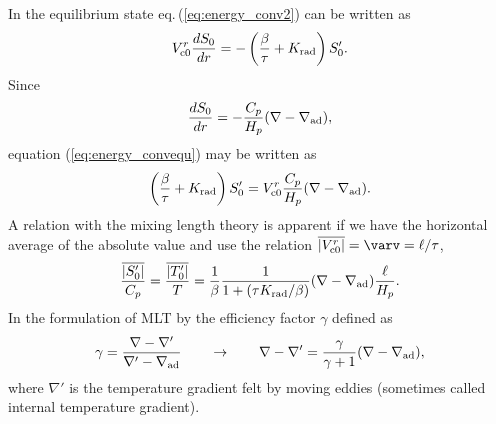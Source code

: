 \documentclass[fleqn,usenatbib]{mnras}
\begin{document}
In the equilibrium state eq.\,(\ref{eq:energy_conv2}) can be written as
\begin{equation}
V_{{\rm c}0}^r{dS_0\over dr} 
= -\left({\beta\over\tau}+K_{\rm rad}\right)S'_0.
\label{eq:energy_convequ}
\end{equation} 
Since 
\begin{equation}
{dS_0\over dr} = - {C_p\over H_p}(\nabla - \nabla_{\rm ad}),
\end{equation}
equation (\ref{eq:energy_convequ}) may be written as
\begin{equation}
 \left({\beta\over\tau} + K_{\rm rad}\right)S'_0
= V_{{\rm c}0}^r{C_p\over H_p}(\nabla-\nabla_{\rm ad}). 
\label{eq:S-Vr}
\end{equation}
A relation with the mixing length theory is apparent if we have the 
horizontal average of the absolute value and use the relation 
$\overline{|V_{{\rm c}0}^r|} = \varv = \ell/\tau$,
\begin{equation}
{\overline{|S'_0|}\over C_p}={\overline{|T'_0|}\over T} = {1\over\beta}{1\over 1 +(\tau K_{\rm rad}/\beta)}
(\nabla-\nabla_{\rm ad}){\ell\over H_p}.
\label{eq:deltaT}
\end{equation} 
In the formulation of MLT by \citet{Henyey1965} 
the efficiency factor $\gamma$ defined as
\begin{equation}
\gamma = {\nabla-\nabla'\over\nabla'-\nabla_{\rm ad}} 
\qquad \rightarrow \qquad
\nabla - \nabla' = {\gamma\over\gamma+1}(\nabla-\nabla_{\rm ad}),
\label{eq:gamma}
\end{equation}
where $\nabla'$ is the temperature gradient felt by moving eddies (sometimes called 
internal temperature gradient).
\end{document}
